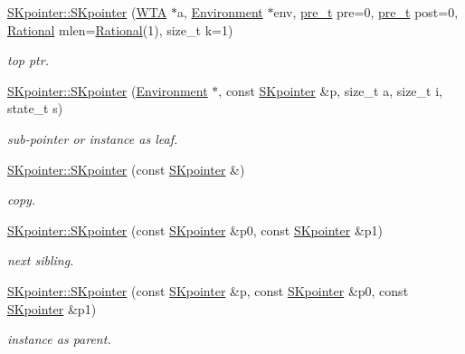 \begin{DoxyCompactItemize}
\mbox{\hyperlink{group__table_ga022b6998c4273e2da8128ccd2205a7f6}{S\+Kpointer\+::\+S\+Kpointer}} (\mbox{\hyperlink{classWTA}{W\+TA}} $\ast$a, \mbox{\hyperlink{classEnvironment}{Environment}} $\ast$env, \mbox{\hyperlink{group__general_ga092fe8b972dfa977c2a0886720a7731e}{pre\+\_\+t}} pre=0, \mbox{\hyperlink{group__general_ga092fe8b972dfa977c2a0886720a7731e}{pre\+\_\+t}} post=0, \mbox{\hyperlink{classRational}{Rational}} mlen=\mbox{\hyperlink{classRational}{Rational}}(1), size\+\_\+t k=1)
\begin{DoxyCompactList}\small\item\em top ptr. \end{DoxyCompactList}\item 
\mbox{\hyperlink{group__table_gac3044b001a0035c0ea79ffac0a57d1d9}{S\+Kpointer\+::\+S\+Kpointer}} (\mbox{\hyperlink{classEnvironment}{Environment}} $\ast$, const \mbox{\hyperlink{classSKpointer}{S\+Kpointer}} \&p, size\+\_\+t a, size\+\_\+t i, state\+\_\+t s)
\begin{DoxyCompactList}\small\item\em sub-\/pointer or instance as leaf. \end{DoxyCompactList}\item 
\mbox{\label{group__table_gae5dd2d6c4dde18082b5e20e34ead8bf3}} 
\mbox{\hyperlink{group__table_gae5dd2d6c4dde18082b5e20e34ead8bf3}{S\+Kpointer\+::\+S\+Kpointer}} (const \mbox{\hyperlink{classSKpointer}{S\+Kpointer}} \&)
\begin{DoxyCompactList}\small\item\em copy. \end{DoxyCompactList}\item 
\mbox{\hyperlink{group__table_gaf762b88808d2e8188b74e28256d3ed09}{S\+Kpointer\+::\+S\+Kpointer}} (const \mbox{\hyperlink{classSKpointer}{S\+Kpointer}} \&p0, const \mbox{\hyperlink{classSKpointer}{S\+Kpointer}} \&p1)
\begin{DoxyCompactList}\small\item\em next sibling. \end{DoxyCompactList}\item 
\mbox{\hyperlink{group__table_ga8c3f64b049fb3809bec46ba47a124ab9}{S\+Kpointer\+::\+S\+Kpointer}} (const \mbox{\hyperlink{classSKpointer}{S\+Kpointer}} \&p, const \mbox{\hyperlink{classSKpointer}{S\+Kpointer}} \&p0, const \mbox{\hyperlink{classSKpointer}{S\+Kpointer}} \&p1)
\begin{DoxyCompactList}\small\item\em instance as parent. \end{DoxyCompactList}\item 

\end{DoxyCompactItemize}
